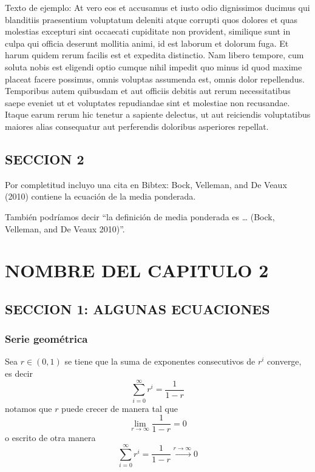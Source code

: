 \documentclass[12pt,reqno,oneside,pdftex]{formato-puc/puctesis} %
\begin{document}
Texto de ejemplo: At vero eos et accusamus et iusto odio dignissimos
ducimus qui blanditiis praesentium voluptatum deleniti atque corrupti
quos dolores et quas molestias excepturi sint occaecati cupiditate non
provident, similique sunt in culpa qui officia deserunt mollitia animi,
id est laborum et dolorum fuga. Et harum quidem rerum facilis est et
expedita distinctio. Nam libero tempore, cum soluta nobis est eligendi
optio cumque nihil impedit quo minus id quod maxime placeat facere
possimus, omnis voluptas assumenda est, omnis dolor repellendus.
Temporibus autem quibusdam et aut officiis debitis aut rerum
necessitatibus saepe eveniet ut et voluptates repudiandae sint et
molestiae non recusandae. Itaque earum rerum hic tenetur a sapiente
delectus, ut aut reiciendis voluptatibus maiores alias consequatur aut
perferendis doloribus asperiores repellat.

\hypertarget{seccion-2}{%
\section{SECCION 2}\label{seccion-2}}

Por completitud incluyo una cita en Bibtex: Bock, Velleman, and De Veaux
(2010) contiene la ecuación de la media ponderada.

También podríamos decir ``la definición de media ponderada es \ldots{}
(Bock, Velleman, and De Veaux 2010)''.

\chapter{NOMBRE DEL CAPITULO 2}

\hypertarget{seccion-1-algunas-ecuaciones}{%
\section{SECCION 1: ALGUNAS
ECUACIONES}\label{seccion-1-algunas-ecuaciones}}

\hypertarget{serie-geomuxe9trica}{%
\subsection{Serie geométrica}\label{serie-geomuxe9trica}}

Sea \(r\in (0,1)\) se tiene que la suma de exponentes consecutivos de
\(r^i\) converge, es decir \begin{equation}
\sum_{i=0}^{\infty} r^i = \frac{1}{1-r}
\end{equation} notamos que \(r\) puede crecer de manera tal que \[
\lim_{r\to \infty} \frac{1}{1-r} = 0
\] o escrito de otra manera \[
\sum_{i=0}^{\infty} r^i = \frac{1}{1-r} \stackrel{r\to \infty}{\longrightarrow} 0
\]
\end{document}

